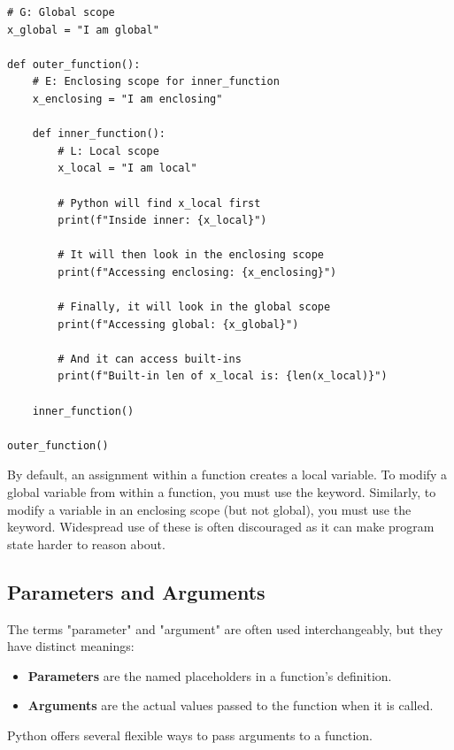 \begin{example}
\text{ }\begin{verbatim}
# G: Global scope
x_global = "I am global"

def outer_function():
    # E: Enclosing scope for inner_function
    x_enclosing = "I am enclosing"
    
    def inner_function():
        # L: Local scope
        x_local = "I am local"
        
        # Python will find x_local first
        print(f"Inside inner: {x_local}")
        
        # It will then look in the enclosing scope
        print(f"Accessing enclosing: {x_enclosing}")
        
        # Finally, it will look in the global scope
        print(f"Accessing global: {x_global}")
        
        # And it can access built-ins
        print(f"Built-in len of x_local is: {len(x_local)}")
        
    inner_function()

outer_function()
\end{verbatim}
\end{example}
\begin{remark}
By default, an assignment within a function creates a local variable. To modify a global variable from within a function, you must use the  keyword. Similarly, to modify a variable in an enclosing scope (but not global), you must use the  keyword. Widespread use of these is often discouraged as it can make program state harder to reason about.
\end{remark}

\subsection{Parameters and Arguments}
\label{subsec:parameters_arguments}
The terms "parameter" and "argument" are often used interchangeably, but they have distinct meanings:
\begin{itemize}
    \item \textbf{Parameters} are the named placeholders in a function's definition.
    \item \textbf{Arguments} are the actual values passed to the function when it is called.
\end{itemize}
Python offers several flexible ways to pass arguments to a function.

